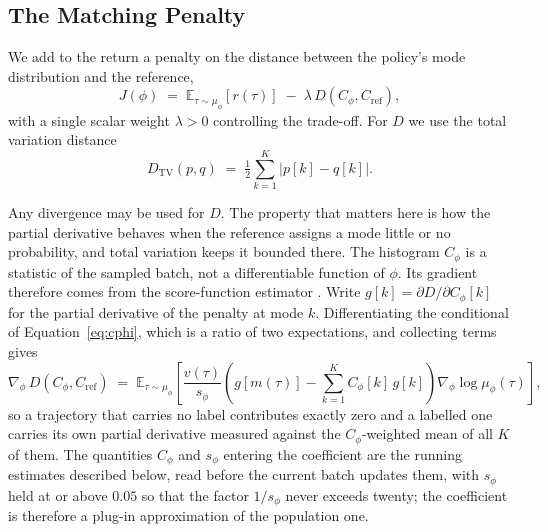 \documentclass[preprint,12pt]{elsarticle}
\begin{document}
\subsection{The Matching Penalty}\label{sec:matching}

We add to the return a penalty on the distance between the policy's mode
distribution and the reference,
\begin{equation}\label{eq:objective}
  J(\phi) \;=\; \mathbb{E}_{\tau \sim \mu_\phi}\!\left[r(\tau)\right]
  \;-\; \lambda \, D\!\left(C_\phi, C_{\mathrm{ref}}\right),
\end{equation}
with a single scalar weight $\lambda > 0$ controlling the trade-off. For $D$ we
use the total variation distance
\begin{equation}\label{eq:tv}
  D_{\mathrm{TV}}(p, q) \;=\; \tfrac{1}{2} \sum_{k=1}^{K} \left| p[k] - q[k] \right| .
\end{equation}

Any divergence may be used for $D$. The property that matters here is how the
partial derivative behaves when the reference assigns a mode little or no
probability, and total variation keeps it bounded there.
The histogram $C_\phi$ is a statistic of the sampled batch, not a differentiable
function of $\phi$. Its gradient therefore comes from the score-function
estimator \citep{williams1992reinforce}. Write $g[k] = \partial D / \partial
C_\phi[k]$ for the partial derivative of the penalty at mode $k$. Differentiating
the conditional of Equation~\ref{eq:cphi}, which is a ratio of two expectations,
and collecting terms gives
\begin{equation}\label{eq:grad}
  \nabla_\phi \, D\!\left(C_\phi, C_{\mathrm{ref}}\right)
  \;=\; \mathbb{E}_{\tau \sim \mu_\phi}\!\left[
    \frac{v(\tau)}{s_\phi}
    \left( g\!\left[m(\tau)\right] - \sum_{k=1}^{K} C_\phi[k]\, g[k] \right)
    \nabla_\phi \log \mu_\phi(\tau)
  \right],
\end{equation}
so a trajectory that carries no label contributes exactly zero and a labelled one
carries its own partial derivative measured against the $C_\phi$-weighted mean of
all $K$ of them. The quantities $C_\phi$ and $s_\phi$ entering the coefficient are
the running estimates described below, read before the current batch updates
them, with $s_\phi$ held at or above $0.05$ so that the factor $1/s_\phi$ never
exceeds twenty; the coefficient is therefore a plug-in approximation of the
population one.
\end{document}

